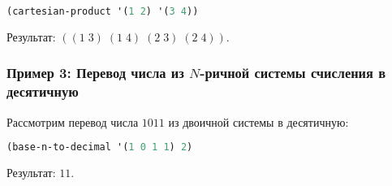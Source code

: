 \begin{lstlisting}[language=Lisp,caption={Декартово произведение}]
	(cartesian-product '(1 2) '(3 4)) 
\end{lstlisting}

Результат: \(((1 \; 3) \; (1 \; 4) \; (2 \; 3) \; (2 \; 4))\).

\subsubsection*{Пример 3: Перевод числа из \(N\)-ричной системы счисления в десятичную}
Рассмотрим перевод числа \(1011\) из двоичной системы в десятичную:

\begin{lstlisting}[language=Lisp,caption={Перевод числа в десятичную систему счисления}]
	(base-n-to-decimal '(1 0 1 1) 2) 
\end{lstlisting}

Результат: \(11\).

